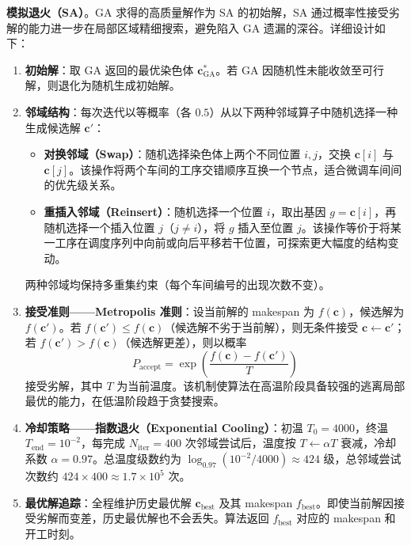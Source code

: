 \documentclass[12pt,a4paper]{ctexart}
\begin{document}
\medskip
\noindent\textbf{模拟退火（SA）}。GA 求得的高质量解作为 SA 的初始解，SA 通过概率性接受劣解的能力进一步在局部区域精细搜索，避免陷入 GA 遗漏的深谷。详细设计如下：

\begin{enumerate}[leftmargin=2.2em, label=(\arabic*)]
\item \textbf{初始解}：取 GA 返回的最优染色体 $\mathbf{c}^*_{\mathrm{GA}}$。若 GA 因随机性未能收敛至可行解，则退化为随机生成初始解。

\item \textbf{邻域结构}：每次迭代以等概率（各 $0.5$）从以下两种邻域算子中随机选择一种生成候选解 $\mathbf{c}'$：
\begin{itemize}
\item \textbf{对换邻域（Swap）}：随机选择染色体上两个不同位置 $i, j$，交换 $\mathbf{c}[i]$ 与 $\mathbf{c}[j]$。该操作将两个车间的工序交错顺序互换一个节点，适合微调车间间的优先级关系。
\item \textbf{重插入邻域（Reinsert）}：随机选择一个位置 $i$，取出基因 $g=\mathbf{c}[i]$，再随机选择一个插入位置 $j$（$j\neq i$），将 $g$ 插入至位置 $j$。该操作等价于将某一工序在调度序列中向前或向后平移若干位置，可探索更大幅度的结构变动。
\end{itemize}
两种邻域均保持多重集约束（每个车间编号的出现次数不变）。

\item \textbf{接受准则——Metropolis 准则}：设当前解的 makespan 为 $f(\mathbf{c})$，候选解为 $f(\mathbf{c}')$。若 $f(\mathbf{c}')\le f(\mathbf{c})$（候选解不劣于当前解），则无条件接受 $\mathbf{c}\leftarrow\mathbf{c}'$；若 $f(\mathbf{c}')>f(\mathbf{c})$（候选解更差），则以概率
\[
P_{\mathrm{accept}} = \exp\!\left(\frac{f(\mathbf{c}) - f(\mathbf{c}')}{T}\right)
\]
接受劣解，其中 $T$ 为当前温度。该机制使算法在高温阶段具备较强的逃离局部最优的能力，在低温阶段趋于贪婪搜索。

\item \textbf{冷却策略——指数退火（Exponential Cooling）}：初温 $T_0=4000$，终温 $T_{\mathrm{end}}=10^{-2}$，每完成 $N_{\mathrm{iter}}=400$ 次邻域尝试后，温度按 $T\leftarrow \alpha T$ 衰减，冷却系数 $\alpha=0.97$。总温度级数约为 $\log_{0.97}(10^{-2}/4000)\approx 424$ 级，总邻域尝试次数约 $424\times400\approx 1.7\times 10^5$ 次。

\item \textbf{最优解追踪}：全程维护历史最优解 $\mathbf{c}_{\mathrm{best}}$ 及其 makespan $f_{\mathrm{best}}$。即使当前解因接受劣解而变差，历史最优解也不会丢失。算法返回 $f_{\mathrm{best}}$ 对应的 makespan 和开工时刻。
\end{enumerate}
\end{document}
